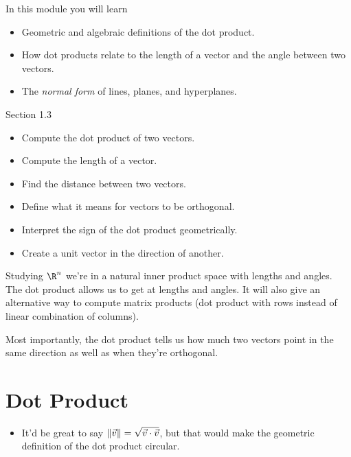 \begin{module}

	In this module you will learn
	\begin{itemize}
		\item Geometric and algebraic definitions of the dot product.
		\item How dot products relate to the length of a vector and the angle
			between two vectors.
		\item The \emph{normal form} of lines, planes, and hyperplanes.
	\end{itemize}

	
	
\end{module}

\begin{lesson}

	Section 1.3

	\begin{itemize}
		\item Compute the dot product of two vectors.
		\item Compute the length of a vector.
		\item Find the distance between two vectors.
		\item Define what it means for vectors to be orthogonal.
		\item Interpret the sign of the dot product geometrically.
		\item Create a unit vector in the direction of another.
	\end{itemize}

	Studying $\R^n$ we're in a natural inner product space with lengths and
	angles. The dot product allows us to get at lengths and angles. It will
	also give an alternative way to compute matrix products (dot product with rows
	instead of linear combination of columns).

	Most importantly, the dot product tells us how much two vectors point in
	the same direction as well as when they're orthogonal.

\end{lesson}


	\bookonlynewpage
\section*{Dot Product}
	\begin{annotation}
		\begin{notes}
			\begin{itemize}
				\item It'd be great to say $\lVert\vec v\rVert=\sqrt{\vec v\cdot \vec v}$,
					but that would make the geometric definition of the dot product circular.
			\end{itemize}
		\end{notes}
	\end{annotation}

